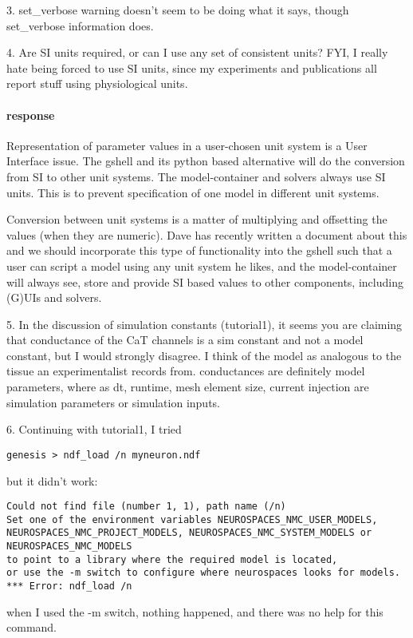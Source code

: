\documentclass[12pt]{article}
\begin{document}
3. set\_verbose warning doesn't seem to be doing what it says, though
set\_verbose information does.

4. Are SI units required, or can I use any set of consistent units?
FYI, I really hate being forced to use SI units, since my experiments
and publications all report stuff using physiological units.

\paragraph{response} Representation of parameter values in a
user-chosen unit system is a User Interface issue.  The gshell and its
python based alternative will do the conversion from SI to other unit
systems.  The model-container and solvers always use SI units.  This
is to prevent specification of one model in different unit systems.

Conversion between unit systems is a matter of multiplying and
offsetting the values (when they are numeric).  Dave has recently
written a document about this and we should incorporate this type of
functionality into the gshell such that a user can script a model
using any unit system he likes, and the model-container will always
see, store and provide SI based values to other components, including
(G)UIs and solvers.


5. In the discussion of simulation constants (tutorial1), it seems you
are claiming that conductance of the CaT channels is a sim constant
and not a model constant, but I would strongly disagree.  I think of
the model as analogous to the tissue an experimentalist records from.
conductances are definitely model parameters, where as dt, runtime,
mesh element size, current injection are simulation parameters or
simulation inputs.

6.  Continuing with tutorial1, I tried
\begin{verbatim}
genesis > ndf_load /n myneuron.ndf
\end{verbatim}
but it didn't work:
\begin{verbatim}
Could not find file (number 1, 1), path name (/n)
Set one of the environment variables NEUROSPACES_NMC_USER_MODELS,
NEUROSPACES_NMC_PROJECT_MODELS, NEUROSPACES_NMC_SYSTEM_MODELS or NEUROSPACES_NMC_MODELS
to point to a library where the required model is located,
or use the -m switch to configure where neurospaces looks for models.
*** Error: ndf_load /n
\end{verbatim}

when I used the -m switch, nothing happened, and there was no help for this command.
\end{document}
